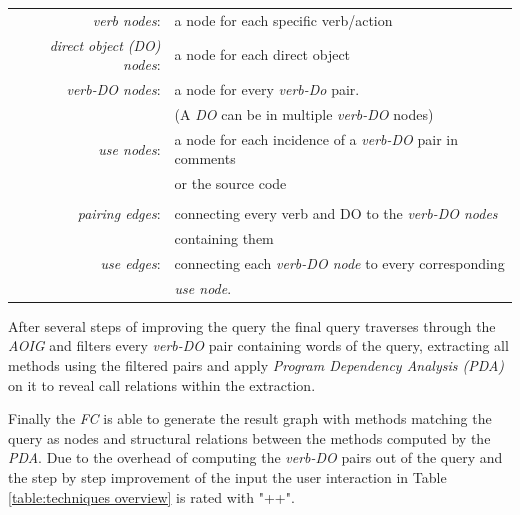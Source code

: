 \begin{table}[th]
	\begin{tabular}{r l}
		\textit{verb nodes}: & a node for each specific verb/action \\
		\textit{direct object (DO) nodes}: & a node for each direct object \\
		\textit{verb-DO nodes}: & a node for every \textit{verb-Do} pair. \\
		&(A \textit{DO} can be in multiple \textit{verb-DO} nodes) \\
		\textit{use nodes}: & a node for each incidence of a \textit{verb-DO} pair in comments \\
		& or the source code \\
		 & \\
		\textit{pairing edges}: & connecting every verb and DO to the \textit{verb-DO nodes} \\
		&containing them \\
		\textit{use edges}: & connecting each \textit{verb-DO node} to every corresponding \\
		& \textit{use node}.
	\end{tabular}
\end{table}

After several steps of improving the query the final query traverses through the \textit{AOIG} and filters every \textit{verb-DO} pair containing words of the query, extracting all methods using the filtered pairs and apply \textit{Program Dependency Analysis (PDA)} on it to reveal call relations within the extraction.

Finally the \emph{FC} is able to generate the result graph with methods matching the query as nodes and structural relations between the methods computed by the \textit{PDA}. \cite{shepherd2007using} \newline
Due to the overhead of computing the \textit{verb-DO} pairs out of the query and the step by step improvement of the input the user interaction in Table \ref{table:techniques overview} is rated with "++".

